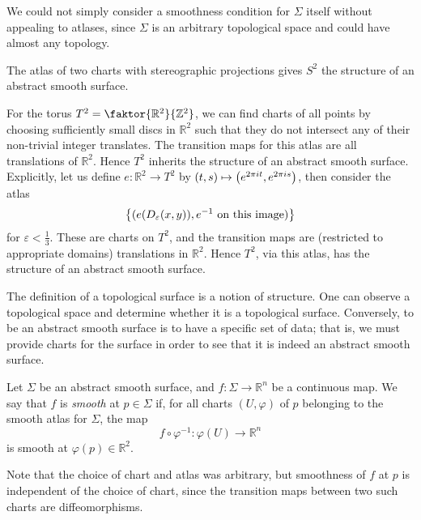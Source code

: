 \begin{remark}
	We could not simply consider a smoothness condition for \( \Sigma \) itself without appealing to atlases, since \( \Sigma \) is an arbitrary topological space and could have almost any topology.
\end{remark}
\begin{example}
	The atlas of two charts with stereographic projections gives \( S^2 \) the structure of an abstract smooth surface.
\end{example}
\begin{example}
	For the torus \( T^2 = \faktor{\mathbb R^2}{\mathbb Z^2} \), we can find charts of all points by choosing sufficiently small discs in \( \mathbb R^2 \) such that they do not intersect any of their non-trivial integer translates.
	The transition maps for this atlas are all translations of \( \mathbb R^2 \).
	Hence \( T^2 \) inherits the structure of an abstract smooth surface.
	Explicitly, let us define \( e \colon \mathbb R^2 \to T^2 \) by \( (t,s) \mapsto \qty(e^{2\pi i t}, e^{2 \pi i s}) \), then consider the atlas
	\[
		\qty{(e\qty(D_\varepsilon(x,y)), e^{-1} \text{ on this image})}
	\]
	for \( \varepsilon < \frac{1}{3} \).
	These are charts on \( T^2 \), and the transition maps are (restricted to appropriate domains) translations in \( \mathbb R^2 \).
	Hence \( T^2 \), via this atlas, has the structure of an abstract smooth surface.
\end{example}
\begin{remark}
	The definition of a topological surface is a notion of structure.
	One can observe a topological space and determine whether it is a topological surface.
	Conversely, to be an abstract smooth surface is to have a specific set of data; that is, we must provide charts for the surface in order to see that it is indeed an abstract smooth surface.
\end{remark}
\begin{definition}
	Let \( \Sigma \) be an abstract smooth surface, and \( f \colon \Sigma \to \mathbb R^n \) be a continuous map.
	We say that \( f \) is \textit{smooth} at \( p \in \Sigma \) if, for all charts \( (U, \varphi) \) of \( p \) belonging to the smooth atlas for \( \Sigma \), the map
	\[
		f \circ \varphi^{-1} \colon \varphi(U) \to \mathbb R^n
	\]
	is smooth at \( \varphi(p) \in \mathbb R^2 \).
\end{definition}
\begin{remark}
	Note that the choice of chart and atlas was arbitrary, but smoothness of \( f \) at \( p \) is independent of the choice of chart, since the transition maps between two such charts are diffeomorphisms.
\end{remark}
